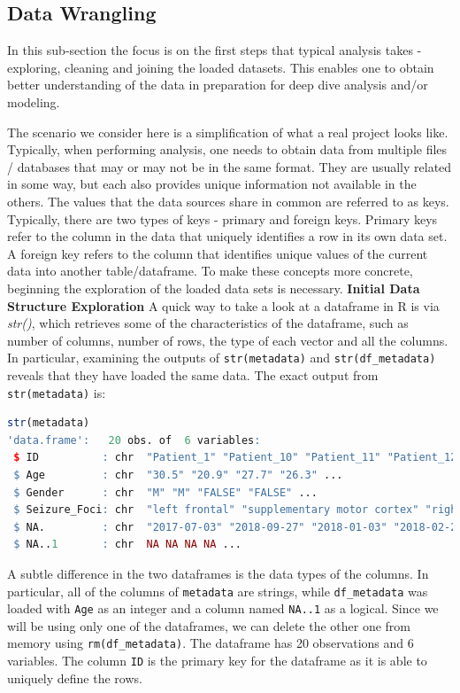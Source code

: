 \subsection{Data Wrangling}
In this sub-section the focus is on the first steps that typical analysis takes - exploring, cleaning and joining the loaded datasets. This enables one to obtain better understanding of the data in preparation for deep dive analysis and/or modeling.

The scenario we consider here is a simplification of what a real project looks like. Typically, when performing analysis, one needs to obtain data from multiple files / databases that may or may not be in the same format. They are usually related in some way, but each also provides unique information not available in the others. The values that the data sources share in common are referred to as keys. Typically, there are two types of keys - primary and foreign keys. Primary keys refer to the column in the data that uniquely identifies a row in its own data set. A foreign key refers to the column that identifies unique values of the current data into another table/dataframe. To make these concepts more concrete, beginning the exploration of the loaded data sets is necessary.
\newline
\newline
\textbf{Initial Data Structure Exploration}
\newline
\newline
A quick way to take a look at a dataframe in R is via \textit{str()}, which retrieves some of the characteristics of the dataframe, such as number of columns, number of rows, the type of each vector and all the columns. In particular, examining the outputs of \verb|str(metadata)| and \verb|str(df_metadata)| reveals that they have loaded the same data. The exact output from \verb|str(metadata)| is:
\begin{lstlisting}[language=R]
str(metadata)
'data.frame':	20 obs. of  6 variables:
 $ ID          : chr  "Patient_1" "Patient_10" "Patient_11" "Patient_12" ...
 $ Age         : chr  "30.5" "20.9" "27.7" "26.3" ...
 $ Gender      : chr  "M" "M" "FALSE" "FALSE" ...
 $ Seizure_Foci: chr  "left frontal" "supplementary motor cortex" "right hippocampus" "left parietal" ...
 $ NA.         : chr  "2017-07-03" "2018-09-27" "2018-01-03" "2018-02-26" ...
 $ NA..1       : chr  NA NA NA NA ...
\end{lstlisting}
A subtle difference in the two dataframes is the data types of the columns. In particular, all of the columns of \verb|metadata| are strings, while \verb|df_metadata| was loaded with \verb|Age| as an integer and a column named \verb|NA..1| as a logical. Since we will be using only one of the dataframes, we can delete the other one from memory using \verb|rm(df_metadata)|. The dataframe has 20 observations and 6 variables. The column \verb|ID| is the primary key for the dataframe as it is able to uniquely define the rows.

